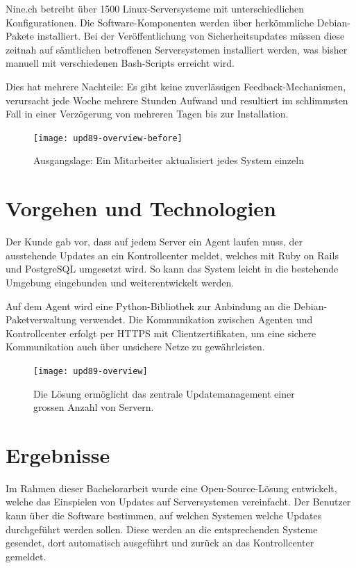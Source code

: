 Nine.ch betreibt über 1500 Linux-Serversysteme mit unterschiedlichen Konfigurationen. Die Software-Komponenten werden über herkömmliche Debian-Pakete installiert. Bei der Veröffentlichung von Sicherheitsupdates müssen diese zeitnah auf sämtlichen betroffenen Serversystemen installiert werden, was bisher manuell mit verschiedenen Bash-Scripts erreicht wird.

Dies hat mehrere Nachteile: Es gibt keine zuverlässigen Feedback-Mechanismen, verursacht jede Woche mehrere Stunden Aufwand und resultiert im schlimmsten Fall in einer Verzögerung von mehreren Tagen bis zur Installation.

\begin{figure}
  \centering
    \texttt{[image: upd89-overview-before]}
  \caption{Ausgangslage: Ein Mitarbeiter aktualisiert jedes System einzeln}
  \label{fig:overview-before}
\end{figure}

\section*{Vorgehen und Technologien}

Der Kunde gab vor, dass auf jedem Server ein Agent laufen muss, der ausstehende Updates an ein Kontrollcenter meldet, welches mit Ruby on Rails und PostgreSQL umgesetzt wird. So kann das System leicht in die bestehende Umgebung eingebunden und weiterentwickelt werden. 

Auf dem Agent wird eine Python-Bibliothek zur Anbindung an die Debian-Paketverwaltung verwendet. Die Kommunikation zwischen Agenten und Kontrollcenter erfolgt per HTTPS mit Clientzertifikaten, um eine sichere Kommunikation auch über unsichere Netze zu gewährleisten.

\begin{figure}
  \centering
    \texttt{[image: upd89-overview]}
  \caption{Die Lösung ermöglicht das zentrale Updatemanagement einer grossen Anzahl von Servern.}
  \label{fig:overview}
\end{figure}

\section*{Ergebnisse}   

Im Rahmen dieser Bachelorarbeit wurde eine Open-Source-Lösung entwickelt, welche das Einspielen von Updates auf Serversystemen vereinfacht. Der Benutzer kann über die Software bestimmen, auf welchen Systemen welche Updates durchgeführt werden sollen. Diese werden an die entsprechenden Systeme gesendet, dort automatisch ausgeführt und zurück an das Kontrollcenter gemeldet.


